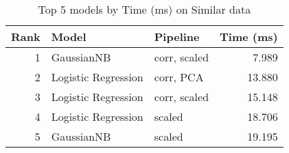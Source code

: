 \begin{table}[!htb]
\centering
\begin{tabular}{rllr}
\toprule
Rank & Model & Pipeline & Time (ms) \\
\midrule
1 & GaussianNB & corr, scaled & 7.989 \\
2 & Logistic Regression & corr, PCA & 13.880 \\
3 & Logistic Regression & corr, scaled & 15.148 \\
4 & Logistic Regression & scaled & 18.706 \\
5 & GaussianNB & scaled & 19.195 \\
\bottomrule
\end{tabular}
\caption{Top 5 models by Time (ms) on Similar data}
\label{table-top-5-time-(ms)-similar}
\end{table}
